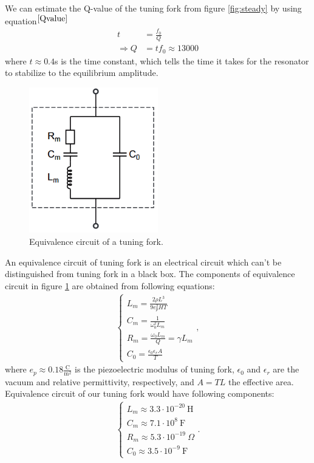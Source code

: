 \documentclass[12pt]{article}
\begin{document}
We can estimate the Q-value of the tuning fork from figure \ref{fig:steady} by using equation$^{\cite{Qvalue}}$
\begin{align*}
t &= \frac{f_0}{Q}\\
\Rightarrow Q &= tf_0 \approx 13000
\end{align*}
where $t \approx 0.4$s is the time constant, which tells the time it takes for the resonator to stabilize to the equilibrium amplitude.

\begin{figure}
\centering
\includegraphics[width = 0.5\textwidth]{equivalence_circuit}
\caption{Equivalence circuit of a tuning fork.} \label{fig:equivalence_circuit}
\end{figure}

An equivalence circuit of tuning fork is an electrical circuit which can't be distinguished from tuning fork in a black box. The components of equivalence circuit in figure \ref{fig:equivalence_circuit} are obtained from following equations:
\begin{align}
\begin{cases}
L_m = \frac{2\rho L^3}{9e_p^2HT}\\
C_m = \frac{1}{\omega_0^2L_m}\\
R_m = \frac{\omega_0 L_m}{Q}=\gamma L_m\\
C_0 = \frac{\epsilon_0\epsilon_rA}{T}
\end{cases},
\end{align}
where $e_p \approx 0.18 \frac{\mathrm{C}}{\mathrm{m}^2}$ is the piezoelectric modulus of tuning fork, $\epsilon_0$ and $\epsilon_r$ are the vacuum and relative permittivity, respectively, and $A = TL$ the effective area. Equivalence circuit of our tuning fork would have following components:
\begin{align*}
\begin{cases}
L_m \approx 3.3\cdot10^{-20}~\mathrm{H}\\
C_m \approx 7.1\cdot10^8~\mathrm{F}\\
R_m \approx 5.3\cdot10^{-19}~\Omega\\
C_0 \approx 3.5\cdot10^{-9}~\mathrm{F}
\end{cases}.
\end{align*}
\end{document}

